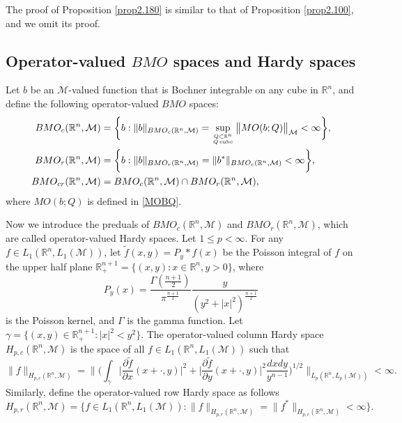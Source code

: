 \documentclass[oneside,english,a4wide]{amsart}
\numberwithin{equation}{section}
\numberwithin{figure}{section}
\theoremstyle{plain}
\theoremstyle{plain}
\theoremstyle{definition}
\theoremstyle{plain}
\theoremstyle{remark}
\theoremstyle{definition}
\theoremstyle{remark}
\theoremstyle{definition}
\newcommand{\8}{\infty}
\begin{document}
The proof of Proposition \ref{prop2.180} is similar to that of Proposition \ref{prop2.100}, and we omit its proof.

\subsection{Operator-valued $BMO$ spaces and Hardy spaces}\label{ovbmo}

Let $b$ be an $\mathcal{M}$-valued function that is Bochner integrable on any cube in $\mathbb{R}^n$, and define the following operator-valued $BMO$ spaces:
\begin{equation*}
	\begin{aligned}
		BMO_c(\mathbb{R}^n,\mathcal{M}){}&=\biggl\{b:\|b\|_{BMO_c(\mathbb{R}^n,\mathcal{M})}=\sup_{Q\subset \mathbb{R}^n \atop Q \operatorname{cube}}\big\|MO(b;Q)\big\|_{\mathcal{M}}<\infty \biggr\},\\
		BMO_r(\mathbb{R}^n,\mathcal{M})	&=\biggl\{b:\|b\|_{BMO_r(\mathbb{R}^n,\mathcal{M})}=\|b^*\|_{BMO_c(\mathbb{R}^n,\mathcal{M})}<\infty\biggr\},\\
		BMO_{cr}(\mathbb{R}^n,\mathcal{M})&=BMO_c(\mathbb{R}^n,\mathcal{M})\cap	BMO_r(\mathbb{R}^n,\mathcal{M}),
	\end{aligned}
\end{equation*}
where $MO(b;Q)$ is defined in \eqref{MOBQ}.

Now we introduce the preduals of $BMO_c(\mathbb{R}^n,\mathcal{M})$ and $BMO_r(\mathbb{R}^n,\mathcal{M})$, which are called operator-valued Hardy spaces. Let $1\le p<\infty$. For any $f\in L_1(\mathbb{R}^n,L_1(\mathcal{M}))$, let $\tilde{f}(x,y)=P_y\ast f(x)$ be the Poisson integral of $f$ on the upper half plane $\mathbb{R}_+^{n+1}=\{(x,y):x\in \mathbb{R}^n,y>0\}$, where 
$$P_y(x)=\frac{\Gamma(\frac{n+1}{2})}{\pi^{\frac{n+1}{2}}}\frac{y}{(y^2+|x|^2)^{\frac{n+1}{2}}}$$
is the Poisson kernel, and $\Gamma$ is the gamma function. Let $\gamma=\{(x,y)\in \mathbb{R}_+^{n+1}:|x|^2<y^2\}$. The operator-valued column Hardy space $H_{p,c}(\mathbb{R}^n,\mathcal{M})$ is the space of all $f\in L_1(\mathbb{R}^n,L_1(\mathcal{M}))$ such that 
\begin{equation*}
	\|f\|_{H_{p,c}(\mathbb{R}^n,\mathcal{M})}=\bigg\|\bigg(\int_{\gamma}  \Big|\frac{\partial \tilde{f}}{\partial x}(x+\cdot,y)\Big|^2+  \Big|\frac{\partial \tilde{f}}{\partial y}(x+\cdot,y)\Big|^2 \frac{dxdy}{y^{n-1}}\bigg)^{1/2}\bigg\|_{L_p(\mathbb{R}^n,L_p(\mathcal{M}))}<\infty.
\end{equation*}
Similarly, define the operator-valued row Hardy space as follows
\begin{equation*}
	H_{p,r}(\mathbb{R}^n,\mathcal{M})=\bigg\{f\in L_1(\mathbb{R}^n,L_1(\mathcal{M})):\|f\|_{H_{p,r}(\mathbb{R}^n,\mathcal{M})}=\|f^*\|_{H_{p,c}(\mathbb{R}^n,\mathcal{M})}<\infty  \bigg\}.
\end{equation*}
\end{document}
